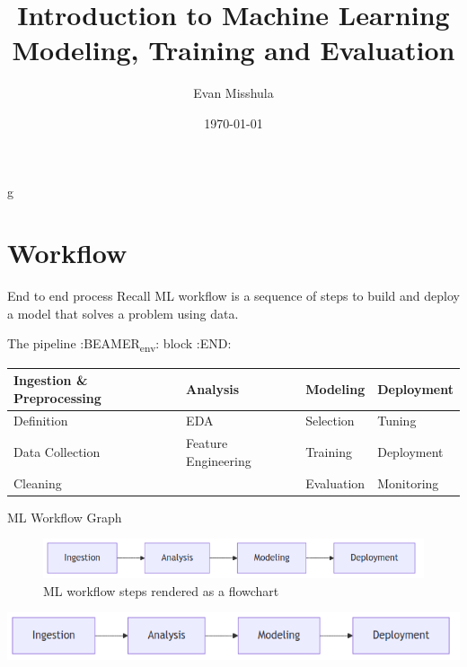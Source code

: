 \documentclass[aspectratio=169]{beamer}
\author{Evan Misshula}
\date{\today}
\title{Introduction to Machine Learning Modeling, Training and Evaluation}
\begin{document}
\maketitle
g
\section{Workflow}
\label{sec:orgc917d96}
\begin{frame}[label={sec:org2f77b01}]{End to end process}
Recall \alert{ML workflow} is a sequence of steps to build and deploy a model that
solves a problem using data.
\end{frame}

\begin{frame}[label={sec:org0e60057}]{The pipeline}
:BEAMER\textsubscript{env}: block
:END:

\begin{center}
\begin{tabular}{llll}
Ingestion \& Preprocessing & Analysis & \alert{Modeling} & Deployment\\[0pt]
\hline
Definition & EDA & \alert{Selection} & Tuning\\[0pt]
Data Collection & Feature Engineering & \alert{Training} & Deployment\\[0pt]
Cleaning &  & \alert{Evaluation} & Monitoring\\[0pt]
\end{tabular}
\end{center}
\end{frame}

\begin{frame}[label={sec:org62e5be9}]{ML Workflow Graph}
\begin{figure}[htbp]
\centering
\includegraphics[width=.9\linewidth]{workflow.png}
\caption{ML workflow steps rendered as a flowchart}
\end{figure}


\begin{center}
\includegraphics[width=.9\linewidth]{workflow.png}
\end{center}
\end{frame}
\end{document}
